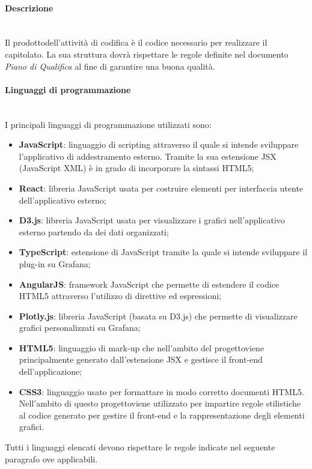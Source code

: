 			\paragraph*{Descrizione}\mbox{}\\ [1mm]
			Il prodotto\glosp dell'attività di codifica è il codice necessario per realizzare il capitolato\glo. La sua struttura dovrà rispettare le regole definite nel documento \textit{Piano di Qualifica} al fine di garantire una buona qualità.
			\paragraph*{Linguaggi di programmazione}\mbox{}\\ [1mm]
			I principali linguaggi di programmazione utilizzati sono:
			\begin{itemize}
				\item \textbf{JavaScript}: linguaggio di scripting attraverso il quale si intende sviluppare l'applicativo di addestramento esterno. Tramite la sua estensione JSX (JavaScript XML) è in grado di incorporare la sintassi HTML5;
				\item \textbf{React}: libreria JavaScript usata per costruire elementi per interfaccia utente dell'applicativo esterno;
				\item \textbf{D3.js}: libreria JavaScript usata per visualizzare i grafici nell'applicativo esterno partendo da dei dati organizzati;
				\item \textbf{TypeScript}: estensione di JavaScript tramite la quale si intende sviluppare il plug-in su Grafana\glo;
				\item \textbf{AngularJS}: framework JavaScript che permette di estendere il codice HTML5 attraverso l'utilizzo di direttive ed espressioni;
				\item \textbf{Plotly.js}: libreria JavaScript (basata su D3.js) che permette di visualizzare grafici personalizzati su Grafana\glo; 
				\item \textbf{HTML5}: linguaggio di mark-up che nell'ambito del progetto\glosp viene principalmente generato dall'estensione JSX e gestisce il front-end dell'applicazione;
				\item \textbf{CSS3}: linguaggio usato per formattare in modo corretto documenti HTML5. Nell'ambito di questo progetto\glosp viene utilizzato per impartire regole stilistiche al codice generato per gestire il front-end e la rappresentazione degli elementi grafici.
			\end{itemize}
			Tutti i linguaggi elencati devono rispettare le regole indicate nel seguente paragrafo ove applicabili.
